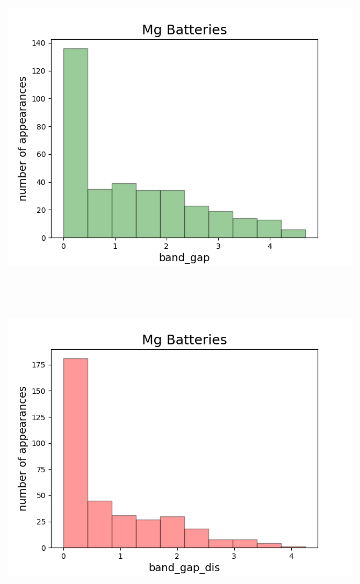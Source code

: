 \begin{figure}[h]
\begin{subfigure}{0.2\textwidth}
     \end{subfigure}
          ~ 
         \begin{subfigure}{0.2\textwidth}
         \centering
         \includegraphics[width=\linewidth]{result/figures/distribution/Mg_distrof_band_gap.png}
         
     \end{subfigure}
          ~ 
     \begin{subfigure}{0.2\textwidth}
         \centering
         \includegraphics[width=\linewidth]{result/figures/distribution/Mg_distrof_band_gap_dis.png}
         

\end{subfigure}
\end{figure}
